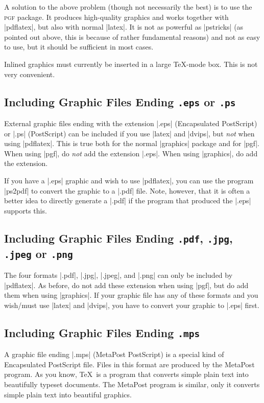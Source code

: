 A solution to the above problem (though not necessarily the best) is to use the \textsc{pgf} package. It produces high-quality graphics and works together with |pdflatex|, but also with normal |latex|. It is not as powerful as |pstricks| (as pointed out above, this is because of rather fundamental reasons) and not as easy to use, but it should be sufficient in most cases.

\lyxnote
Inlined graphics must currently be inserted in a large \TeX-mode box. This is not very convenient.


\subsection{Including Graphic Files Ending \texttt{.eps} or \texttt{.ps}}

External graphic files ending with the extension |.eps| (Encapsulated PostScript) or |.ps| (PostScript) can be included if you use |latex| and |dvips|, but \emph{not} when using |pdflatex|. This is true both for the normal |graphics| package and for |pgf|. When using |pgf|, do \emph{not} add the extension |.eps|. When using |graphics|, do add the extension.

If you have a |.eps| graphic and wish to use |pdflatex|, you can use the program |ps2pdf| to convert the graphic to a |.pdf| file. Note, however, that it is often a better idea to directly generate a |.pdf| if the program that produced the |.eps| supports this.


\subsection{Including Graphic Files Ending \texttt{.pdf}, \texttt{.jpg}, \texttt{.jpeg} or \texttt{.png}}

The four formats |.pdf|, |.jpg|, |.jpeg|, and |.png| can only be included by |pdflatex|. As before, do not add these extension when using |pgf|, but do add them when using |graphics|. If your graphic file has any of these formats and you wish/must use |latex| and |dvips|, you  have to convert your graphic to |.eps| first.


\subsection{Including Graphic Files Ending \texttt{.mps}}

A graphic file ending |.mps| (MetaPost PostScript) is a special kind of Encapsulated PostScript file. Files in this format are produced by the MetaPost program. As you know, \TeX\ is a program that converts simple plain text into beautifully typeset documents. The MetaPost program is similar, only it converts simple plain text into beautiful graphics.

